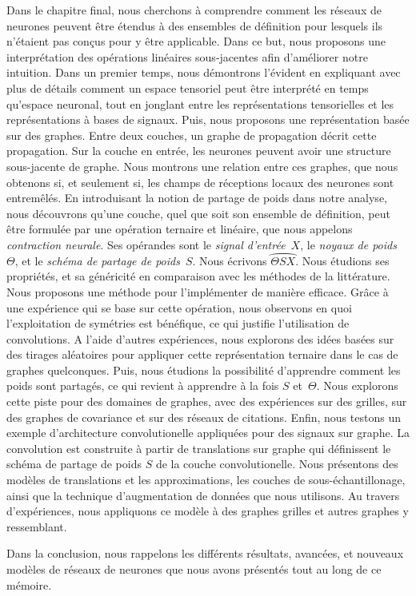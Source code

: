 Dans le chapitre final, nous cherchons à comprendre comment les réseaux de neurones peuvent être étendus à des ensembles de définition pour lesquels ils n'étaient pas conçus pour y être applicable. Dans ce but, nous proposons une interprétation des opérations linéaires sous-jacentes afin d'améliorer notre intuition. Dans un premier temps, nous démontrons l'évident en expliquant avec plus de détails comment un espace tensoriel peut être interprété en temps qu'espace neuronal, tout en jonglant entre les représentations tensorielles et les représentations à bases de signaux. Puis, nous proposons une représentation basée sur des graphes. Entre deux couches, un graphe de propagation décrit cette propagation. Sur la couche en entrée, les neurones peuvent avoir une structure sous-jacente de graphe. Nous montrons une relation entre ces graphes, que nous obtenons si, et seulement si, les champs de réceptions locaux des neurones sont entremêlés. En introduisant la notion de partage de poids dans notre analyse, nous découvrons qu'une couche, quel que soit son ensemble de définition, peut être formulée par une opération ternaire et linéaire, que nous appelons \emph{contraction neurale}. Ses opérandes sont le \emph{signal d'entrée}~$X$, le \emph{noyaux de poids}~$\Theta$, et le \emph{schéma de partage de poids}~$S$. Nous écrivons $\wideparen{\Theta S X}$. Nous étudions ses propriétés, et sa généricité en comparaison avec les méthodes de la littérature. Nous proposons une méthode pour l'implémenter de manière efficace. Grâce à une expérience qui se base sur cette opération, nous observons en quoi l'exploitation de symétries est bénéfique, ce qui justifie l'utilisation de convolutions. A l'aide d'autres expériences, nous explorons des idées basées sur des tirages aléatoires pour appliquer cette représentation ternaire dans le cas de graphes quelconques. Puis, nous étudions la possibilité d'apprendre comment les poids sont partagés, ce qui revient à apprendre à la fois $S$ et~$\Theta$. Nous explorons cette piste pour des domaines de graphes, avec des expériences sur des grilles, sur des graphes de covariance et sur des réseaux de citations. Enfin, nous testons un exemple d'architecture convolutionelle appliquées pour des signaux sur graphe. La convolution est construite à partir de translations sur graphe qui définissent le schéma de partage de poids $S$ de la couche convolutionelle. Nous présentons des modèles de translations et les approximations, les couches de sous-échantillonage, ainsi que la technique d'augmentation de données que nous utilisons. Au travers d'expériences, nous appliquons ce modèle à des graphes grilles et autres graphes y ressemblant.

Dans la conclusion, nous rappelons les différents résultats, avancées, et nouveaux modèles de réseaux de neurones que nous avons présentés tout au long de ce mémoire.